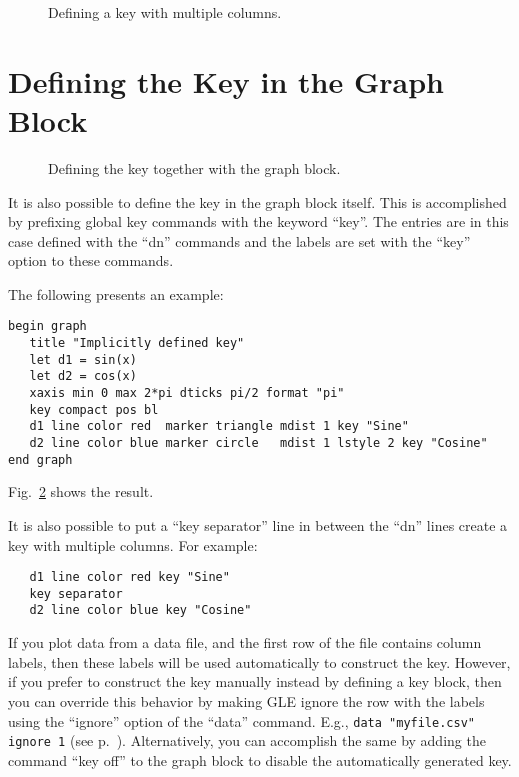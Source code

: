 \begin{figure}[tb]
\centering
\mbox{}
\caption{\label{multicolkey:fig}Defining a key with multiple columns.}
\end{figure}

\section{Defining the Key in the Graph Block}\label{kgrb:sec}

\begin{figure}[tb]
\centering
\mbox{}
\caption{\label{grkey:fig}Defining the key together with the graph block.}
\end{figure}

It is also possible to define the key in the graph block itself. This is accomplished by prefixing global key commands with the keyword ``key''. The entries are in this case defined with the ``dn'' commands and the labels are set with the ``key'' option to these commands.

The following presents an example:

\preglecode{}
\begin{Verbatim}
begin graph
   title "Implicitly defined key"
   let d1 = sin(x)
   let d2 = cos(x)
   xaxis min 0 max 2*pi dticks pi/2 format "pi"
   key compact pos bl
   d1 line color red  marker triangle mdist 1 key "Sine"
   d2 line color blue marker circle   mdist 1 lstyle 2 key "Cosine"
end graph
\end{Verbatim}
\postglecode{}

\noindent{}Fig.~\ref{grkey:fig} shows the result.

It is also possible to put a ``key separator'' line in between the ``dn'' lines create a key with multiple columns. For example:

\preglecode{}
\begin{Verbatim}
   d1 line color red key "Sine"
   key separator
   d2 line color blue key "Cosine"
\end{Verbatim}
\postglecode{}

If you plot data from a data file, and the first row of the file contains column labels, then these labels will be used automatically to construct the key. However, if you prefer to construct the key manually instead by defining a key block, then you can override this behavior by making GLE ignore the row with the labels using the ``ignore'' option of the ``data'' command. E.g., \verb+data "myfile.csv" ignore 1+ (see p.~\pageref{opt:ignore}). Alternatively, you can accomplish the same by adding the command ``key off'' to the graph block to disable the automatically generated key.




